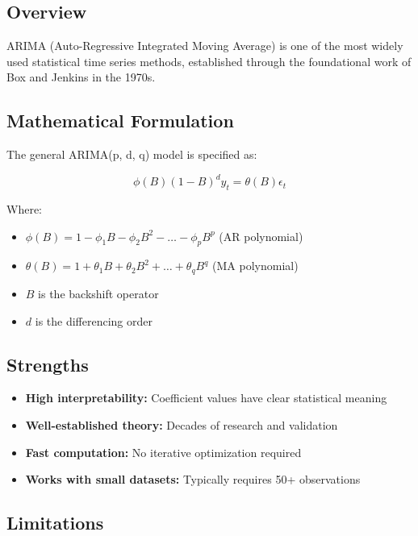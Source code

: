 \documentclass[12pt,a4paper]{article}
\begin{document}
\subsection{Overview}

ARIMA (Auto-Regressive Integrated Moving Average) is one of the most widely used statistical time series methods, established through the foundational work of Box and Jenkins in the 1970s.

\subsection{Mathematical Formulation}

The general ARIMA(p, d, q) model is specified as:

\begin{equation}
\phi(B)(1-B)^d y_t = \theta(B) \epsilon_t
\end{equation}

Where:
\begin{itemize}
    \item $\phi(B) = 1 - \phi_1 B - \phi_2 B^2 - \ldots - \phi_p B^p$ (AR polynomial)
    \item $\theta(B) = 1 + \theta_1 B + \theta_2 B^2 + \ldots + \theta_q B^q$ (MA polynomial)
    \item $B$ is the backshift operator
    \item $d$ is the differencing order
\end{itemize}

\subsection{Strengths}

\begin{itemize}
    \item \textbf{High interpretability:} Coefficient values have clear statistical meaning
    \item \textbf{Well-established theory:} Decades of research and validation
    \item \textbf{Fast computation:} No iterative optimization required
    \item \textbf{Works with small datasets:} Typically requires 50+ observations
\end{itemize}

\subsection{Limitations}
\end{document}
